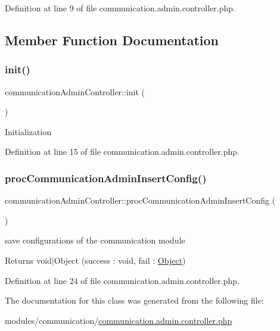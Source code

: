 Definition at line 9 of file communication.\+admin.\+controller.\+php.



\subsection{Member Function Documentation}
\mbox{\label{classcommunicationAdminController_a6ad0b759ad3a139a7cf0784f62297bfb}} 
\subsubsection{\texorpdfstring{init()}{init()}}
{\footnotesize\ttfamily communication\+Admin\+Controller\+::init (\begin{DoxyParamCaption}{ }\end{DoxyParamCaption})}

Initialization 

Definition at line 15 of file communication.\+admin.\+controller.\+php.

\mbox{\label{classcommunicationAdminController_a23dbacf4acc643cea069d1de93b406c9}} 
\subsubsection{\texorpdfstring{proc\+Communication\+Admin\+Insert\+Config()}{procCommunicationAdminInsertConfig()}}
{\footnotesize\ttfamily communication\+Admin\+Controller\+::proc\+Communication\+Admin\+Insert\+Config (\begin{DoxyParamCaption}{ }\end{DoxyParamCaption})}

save configurations of the communication module \begin{DoxyReturn}{Returns}
void$\vert$\+Object (success \+: void, fail \+: \hyperlink{classObject}{Object}) 
\end{DoxyReturn}


Definition at line 24 of file communication.\+admin.\+controller.\+php.



The documentation for this class was generated from the following file\+:\begin{DoxyCompactItemize}
\item 
modules/communication/\hyperlink{communication_8admin_8controller_8php}{communication.\+admin.\+controller.\+php}\end{DoxyCompactItemize}
